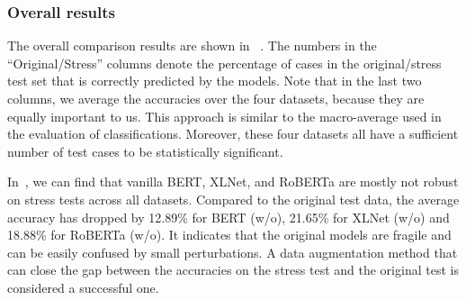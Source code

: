 \subsubsection{Overall results}
\label{sec:overview}

The overall comparison results are shown in ~.
The numbers in the ``Original/Stress'' columns denote the percentage of cases in the original/stress test set that is correctly predicted by the models. 
Note that in the last two columns,
we average the accuracies over the four datasets, because they are equally 
important to us.  This approach is similar to the macro-average used in 
the evaluation of classifications.  Moreover, these four datasets all have 
a sufficient number of test cases to be statistically significant.

In~, we can find that vanilla BERT, XLNet, and RoBERTa 
are mostly not robust on stress tests across all datasets.
Compared to the original test data, 
the average accuracy has dropped by 12.89\% for BERT (w/o), 21.65\% for XLNet (w/o) 
and 18.88\% for RoBERTa (w/o). 
It indicates that the original models are fragile and can be easily confused by 
small perturbations. 
A data augmentation method that can close the gap between the
accuracies on the stress test and the original test is considered
a successful one.

